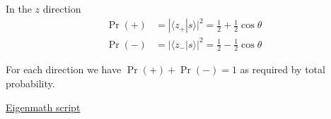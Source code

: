 In the $z$ direction
\begin{align*}
\Pr(+)
&=|\langle z_+|s\rangle|^2
=\tfrac{1}{2}+\tfrac{1}{2}\cos\theta
\\[1ex]
\Pr(-)
&=|\langle z_-|s\rangle|^2
=\tfrac{1}{2}-\tfrac{1}{2}\cos\theta
\end{align*}

For each direction we have $\Pr(+)+\Pr(-)=1$ as required by total probability.

\bigskip
\href{https://georgeweigt.github.io/examples/spin-part-2-demo.html}{Eigenmath script}


